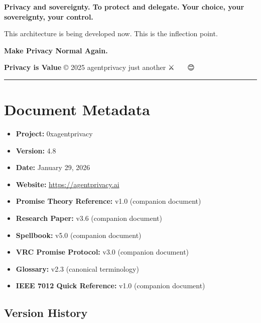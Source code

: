 \documentclass[
]{article}
\begin{document}
\textbf{Privacy and sovereignty. To protect and delegate.} \textbf{Your
choice, your sovereignty, your control.}

This architecture is being developed now. This is the inflection point.

\textbf{Make Privacy Normal Again.}

\textbf{Privacy is Value} © 2025 agentprivacy just another ⚔️ 🧙‍♂️ 🤖 😊

\begin{center}\rule{0.5\linewidth}{0.5pt}\end{center}

\section{Document Metadata}\label{document-metadata}

\begin{itemize}
\item
  \textbf{Project:} 0xagentprivacy
\item
  \textbf{Version:} 4.8
\item
  \textbf{Date:} January 29, 2026
\item
  \textbf{Website:} \url{https://agentprivacy.ai}
\item
  \textbf{Promise Theory Reference:} v1.0 (companion document)
\item
  \textbf{Research Paper:} v3.6 (companion document)
\item
  \textbf{Spellbook:} v5.0 (companion document)
\item
  \textbf{VRC Promise Protocol:} v3.0 (companion document)
\item
  \textbf{Glossary:} v2.3 (canonical terminology)
\item
  \textbf{IEEE 7012 Quick Reference:} v1.0 (companion document)
\end{itemize}

\subsection{Version History}\label{version-history}
\end{document}
